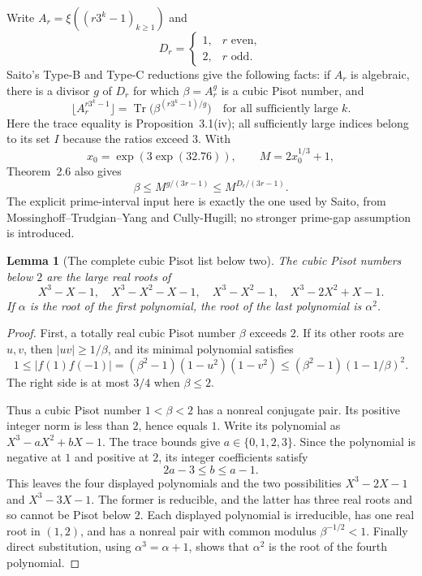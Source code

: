 \documentclass[11pt,a4paper]{article}
\newtheorem{lemma}[theorem]{Lemma}
\theoremstyle{definition}
\theoremstyle{remark}
\numberwithin{equation}{section}
\begin{document}
Write $A_r=\xi((r3^k-1)_{k\ge1})$ and
\[
 D_r=\begin{cases}1,&r\text{ even},\\2,&r\text{ odd}.\end{cases}
\]
Saito's Type-B and Type-C reductions give the following facts:
if $A_r$ is algebraic, there is a divisor $g$ of $D_r$ for which
$\beta=A_r^g$ is a cubic Pisot number, and
\begin{equation}\label{f13:eq:tc-source-traces}
 \lfloor A_r^{r3^k-1}\rfloor
   =\operatorname{Tr}\bigl(\beta^{(r3^k-1)/g}\bigr)
 \quad\text{for all sufficiently large }k.
\end{equation}
Here the trace equality is Proposition~3.1(iv); all sufficiently
large indices belong to its set $I$ because the ratios exceed $3$.
With
\[
 x_0=\exp(3\exp(32.76)),\qquad M=2x_0^{1/3}+1,
\]
Theorem~2.6 also gives
\begin{equation}\label{f13:eq:tc-source-bound}
 \beta\le M^{g/(3r-1)}\le M^{D_r/(3r-1)}.
\end{equation}
The explicit prime-interval input here is exactly the one used by
Saito, from Mossinghoff--Trudgian--Yang and Cully-Hugill; no stronger
prime-gap assumption is introduced.

\begin{lemma}[The complete cubic Pisot list below two]
The cubic Pisot numbers below $2$ are the large real roots of
\[
 X^3-X-1,\quad X^3-X^2-X-1,\quad X^3-X^2-1,\quad
 X^3-2X^2+X-1.
\]
If $\alpha$ is the root of the first polynomial, the root of the
last polynomial is $\alpha^2$.
\end{lemma}
\begin{proof}
First, a totally real cubic Pisot number $\beta$ exceeds $2$.
If its other roots are $u,v$, then $|uv|\ge1/\beta$, and its
minimal polynomial satisfies
\[
 1\le|f(1)f(-1)|
 =(\beta^2-1)(1-u^2)(1-v^2)
 \le(\beta^2-1)(1-1/\beta)^2.
\]
The right side is at most $3/4$ when $\beta\le2$.

Thus a cubic Pisot number $1<\beta<2$ has a nonreal conjugate pair.
Its positive integer norm is less than $2$, hence equals $1$.
Write its polynomial as $X^3-aX^2+bX-1$.  The trace bounds give
$a\in\{0,1,2,3\}$.  Since the polynomial is negative at $1$ and
positive at $2$, its integer coefficients satisfy
\[
 2a-3\le b\le a-1.
\]
This leaves the four displayed polynomials and the two possibilities
$X^3-2X-1$ and $X^3-3X-1$.  The former is reducible, and the latter
has three real roots and so cannot be Pisot below $2$.
Each displayed polynomial is irreducible, has one real root in
$(1,2)$, and has a nonreal pair with common modulus $\beta^{-1/2}<1$.
Finally direct substitution, using $\alpha^3=\alpha+1$, shows that
$\alpha^2$ is the root of the fourth polynomial.
\end{proof}
\end{document}
